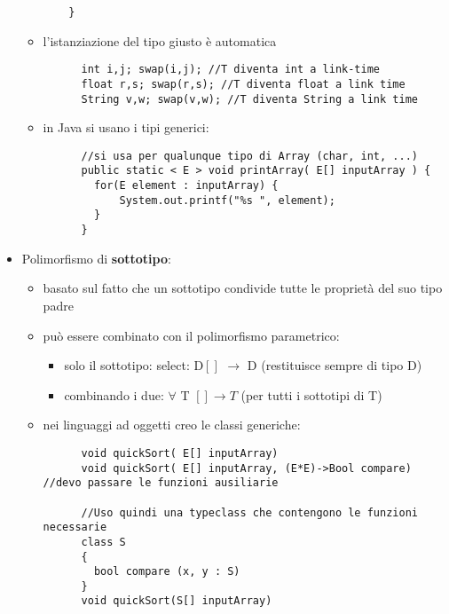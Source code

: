 \documentclass{article}
\begin{document}
\begin{flushleft}
\begin{itemize}
\begin{itemize}
\begin{lstlisting}
    }
  \end{lstlisting}
    \item l'istanziazione del tipo giusto è automatica
    \begin{lstlisting}
      int i,j; swap(i,j); //T diventa int a link-time
      float r,s; swap(r,s); //T diventa float a link time
      String v,w; swap(v,w); //T diventa String a link time
    \end{lstlisting}
    \item in Java si usano i tipi generici:
    \begin{lstlisting}
      //si usa per qualunque tipo di Array (char, int, ...)
      public static < E > void printArray( E[] inputArray ) {
        for(E element : inputArray) {
            System.out.printf("%s ", element);
        }
      }
    \end{lstlisting} 
  \end{itemize} 
  \item Polimorfismo di \textbf{sottotipo}:
  \begin{itemize}
    \item basato sul fatto che un sottotipo condivide tutte le proprietà del suo tipo padre
    \item può essere combinato con il polimorfismo parametrico:
    \begin{itemize}
      \item solo il sottotipo: select: D$[]$ $\rightarrow$ D (restituisce sempre di tipo D)
      \item combinando i due: $\forall$ T $ [] \rightarrow T$ (per tutti i sottotipi di T)
    \end{itemize}
    \item nei linguaggi ad oggetti creo le classi generiche:
    \begin{lstlisting}
      void quickSort( E[] inputArray)
      void quickSort( E[] inputArray, (E*E)->Bool compare) //devo passare le funzioni ausiliarie

      //Uso quindi una typeclass che contengono le funzioni necessarie
      class S
      {
        bool compare (x, y : S)
      }
      void quickSort(S[] inputArray)
    \end{lstlisting}
  \end{itemize}
\end{itemize}

\end{flushleft}
\end{document}
